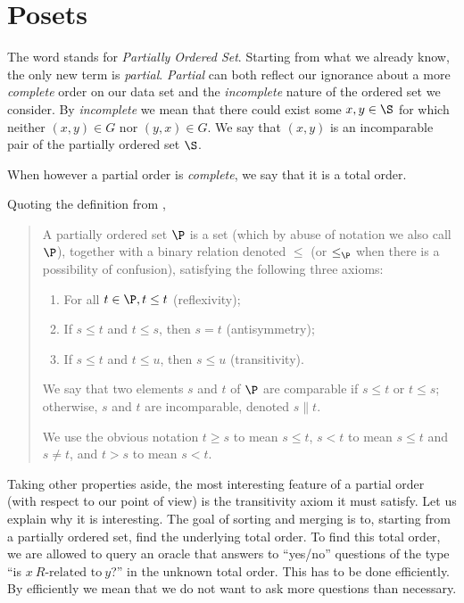\section{Posets}

The word  stands for \emph{Partially Ordered Set}. Starting from
what we already know, the only new term is \emph{partial}. \emph{Partial} can
both reflect our ignorance about a more \emph{complete} order on our data set
and the \emph{incomplete} nature of the ordered set we consider. By
\emph{incomplete} we mean that there could exist some $x, y \in \S$ for which
neither $(x, y) \in G$ nor $(y, x) \in G$. We say that $(x,y)$ is an
incomparable pair of the partially ordered set \(\S\).


When however a partial order is \emph{complete}, we say that it is a total
order.

Quoting the definition from \citet*{Stanley:2011:ECV:2124415},

\begin{quotation}

A partially ordered set $\P$ is a set (which by abuse of notation we also call
$\P$), together with a binary relation denoted $\leq$ (or $\leq_{\P}$ when there is
a possibility of confusion), satisfying the following three axioms:

\begin{enumerate}
\item For all $t \in \P, t \leq t$ (reflexivity);
\item If $s \leq t$ and $t \leq s$, then $s = t$ (antisymmetry);
\item If $s \leq t$ and $t \leq u$, then $s \leq u$ (transitivity).
\end{enumerate}

We say that two elements $s$ and $t$ of $\P$ are comparable if $s \leq t$ or $t
\leq s$; otherwise, $s$ and $t$ are incomparable, denoted $s \parallel t$.

We use the obvious notation $t \geq s$ to mean $s \leq t$, $s < t$ to mean $s
\leq t$ and $s \neq t$, and $t > s$ to mean $s < t$.

\end{quotation}

Taking other properties aside, the most interesting feature of a partial order
(with respect to our point of view) is the transitivity axiom it must satisfy.
Let us explain why it is interesting. The goal of sorting and merging is to,
starting from a partially ordered set, find the underlying total order. To find
this total order, we are allowed to query an oracle that answers to ``yes/no''
questions of the type ``is $x~R\text{-related to}~y$?'' in the unknown total
order. This has to be done efficiently. By efficiently we mean that we do not
want to ask more questions than necessary.

